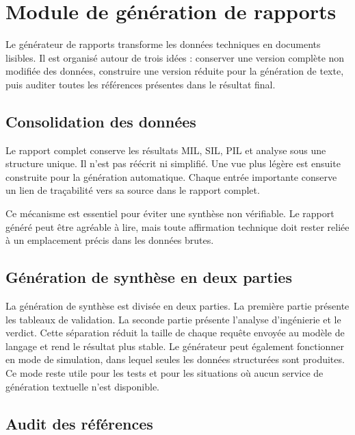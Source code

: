 \section{Module de génération de rapports}
\label{sec:ch5_generateur}

Le générateur de rapports transforme les données techniques en documents lisibles. Il est organisé autour de trois idées : conserver une version complète non modifiée des données, construire une version réduite pour la génération de texte, puis auditer toutes les références présentes dans le résultat final.

\subsection{Consolidation des données}
\label{subsec:ch5_consolidation}

Le rapport complet conserve les résultats MIL, SIL, PIL et analyse sous une structure unique. Il n'est pas réécrit ni simplifié. Une vue plus légère est ensuite construite pour la génération automatique. Chaque entrée importante conserve un lien de traçabilité vers sa source dans le rapport complet.

\noindent
Ce mécanisme est essentiel pour éviter une synthèse non vérifiable. Le rapport généré peut être agréable à lire, mais toute affirmation technique doit rester reliée à un emplacement précis dans les données brutes.

\subsection{Génération de synthèse en deux parties}
\label{subsec:ch5_generation_html}

La génération de synthèse est divisée en deux parties. La première partie présente les tableaux de validation. La seconde partie présente l'analyse d'ingénierie et le verdict. Cette séparation réduit la taille de chaque requête envoyée au modèle de langage et rend le résultat plus stable. Le générateur peut également fonctionner en mode de simulation, dans lequel seules les données structurées sont produites. Ce mode reste utile pour les tests et pour les situations où aucun service de génération textuelle n'est disponible.

\subsection{Audit des références}
\label{subsec:ch5_audit_refs}

